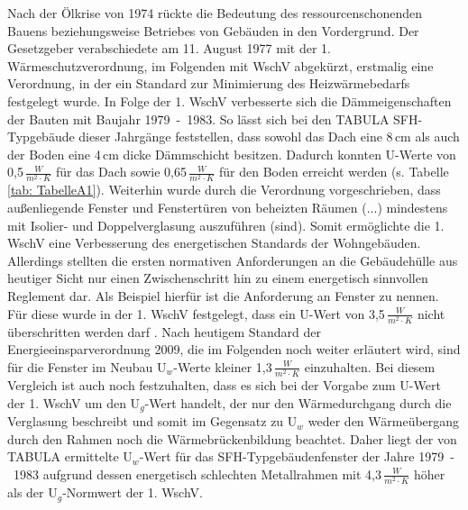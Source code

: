 Nach der Ölkrise von 1974 rückte die Bedeutung des ressourcenschonenden Bauens beziehungsweise Betriebes von Gebäuden in den Vordergrund. 
Der Gesetzgeber verabschiedete am 11. August 1977 mit der 1. Wärmeschutzverordnung, im Folgenden mit WschV abgekürzt, erstmalig eine Verordnung, in der ein Standard zur Minimierung des Heizwärmebedarfs festgelegt wurde. 
In Folge der 1. WschV verbesserte sich die Dämmeigenschaften der Bauten mit Baujahr \mbox{1979 - 1983}.
So lässt sich bei den TABULA SFH-Typgebäude dieser Jahrgänge feststellen, dass sowohl das Dach eine 8\,cm als auch der Boden eine 4\,cm dicke Dämmschicht besitzen. 
Dadurch konnten U-Werte von 0,5\,\(\frac{W}{m^2 \cdot K} \) für das Dach sowie 0,65\,\(\frac{W}{m^2 \cdot K} \) für den Boden erreicht werden (s. Tabelle \ref{tab: TabelleA1}).
Weiterhin wurde durch die Verordnung vorgeschrieben, dass \glqq außenliegende Fenster und Fenstertüren von beheizten Räumen (...) mindestens mit Isolier- und Doppelverglasung auszuführen (sind)\grqq \cite{Bundesregierung.1977}.
Somit ermöglichte die 1. WschV eine Verbesserung des energetischen Standards der Wohngebäuden. 
Allerdings stellten die ersten normativen Anforderungen an die Gebäudehülle aus heutiger Sicht nur einen Zwischenschritt hin zu einem energetisch sinnvollen Reglement dar.
Als Beispiel hierfür ist die Anforderung an Fenster zu nennen. 
Für diese wurde in der 1. WschV festgelegt, dass ein U-Wert von 3,5\,\(\frac{W}{m^2 \cdot K} \) nicht überschritten werden darf \cite{Bundesregierung.1977}.
Nach heutigem Standard der Energieeinsparverordnung 2009, die im Folgenden noch weiter erläutert wird, sind für die Fenster im Neubau U\(_w\)-Werte kleiner 1,3\,\(\frac{W}{m^2 \cdot K} \) einzuhalten.
Bei diesem Vergleich ist auch noch festzuhalten, dass es sich bei der Vorgabe zum U-Wert der 1. WschV um den U\(_g\)-Wert handelt, der nur den Wärmedurchgang durch die Verglasung beschreibt und somit im Gegensatz zu U\(_w\) weder den Wärmeübergang durch den Rahmen noch die Wärmebrückenbildung beachtet. 
Daher liegt der von TABULA ermittelte U\(_w\)-Wert für das SFH-Typgebäudenfenster der Jahre \mbox{1979 - 1983} aufgrund dessen energetisch schlechten Metallrahmen mit 4,3\,\(\frac{W}{m^2 \cdot K} \) höher als der U\(_g\)-Normwert der 1. WschV. \cite{EickeHenning.2011} 

